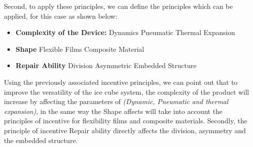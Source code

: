 \documentclass[12pt, twoside]{report}
\begin{document}
\begin{table}[H]\centering\setlength\tabcolsep{5.5pt}\renewcommand{}
  \noindent{}%
  \caption{Observed problems}
\end{table}
Second, to apply these principles, we can define the  principles which can be applied, for this case as shown below:\\
\begin{itemize}
    \item \textbf{Complexity of the Device:}
    \subitem Dynamics
    \subitem Pneumatic
    \subitem Thermal Expansion
    \item \textbf{Shape}
    \subitem Flexible Films
    \subitem Composite Material
    \item \textbf{Repair Ability}
    \subitem Division
    \subitem Asymmetric
    \subitem Embedded Structure
\end{itemize}
Using the previously associated incentive principles, we can point out that to improve the versatility of the ice cube system, the complexity of the product will increase by affecting the parameters of \textit{(Dynamic, Pneumatic and thermal expansion)}, in the same way the Shape affects will take into account the principles of incentive for flexibility films and composite materials. Secondly, the principle of incentive Repair ability directly affects the division, asymmetry and the embedded structure.
\end{document}

